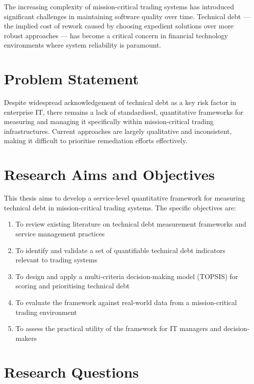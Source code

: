 \documentclass[
  11pt,
  letterpaper,
  11pt,
  english,
  onehalfspacing,
  headsepline]{MastersDoctoralThesis}
\providecommand{\tightlist}{%
  \setlength{\itemsep}{0pt}\setlength{\parskip}{0pt}}
\begin{document}
The increasing complexity of mission-critical trading systems has
introduced significant challenges in maintaining software quality over
time. Technical debt --- the implied cost of rework caused by choosing
expedient solutions over more robust approaches --- has become a
critical concern in financial technology environments where system
reliability is paramount.

\section{Problem Statement}\label{problem-statement-1}

Despite widespread acknowledgement of technical debt as a key risk
factor in enterprise IT, there remains a lack of standardised,
quantitative frameworks for measuring and managing it specifically
within mission-critical trading infrastructures. Current approaches are
largely qualitative and inconsistent, making it difficult to prioritise
remediation efforts effectively.

\section{Research Aims and
Objectives}\label{research-aims-and-objectives-1}

This thesis aims to develop a service-level quantitative framework for
measuring technical debt in mission-critical trading systems. The
specific objectives are:

\begin{enumerate}
\def\labelenumi{\arabic{enumi}.}
\tightlist
\item
  To review existing literature on technical debt measurement frameworks
  and service management practices
\item
  To identify and validate a set of quantifiable technical debt
  indicators relevant to trading systems
\item
  To design and apply a multi-criteria decision-making model (TOPSIS)
  for scoring and prioritising technical debt
\item
  To evaluate the framework against real-world data from a
  mission-critical trading environment
\item
  To assess the practical utility of the framework for IT managers and
  decision-makers
\end{enumerate}

\section{Research Questions}\label{research-questions-1}
\end{document}

